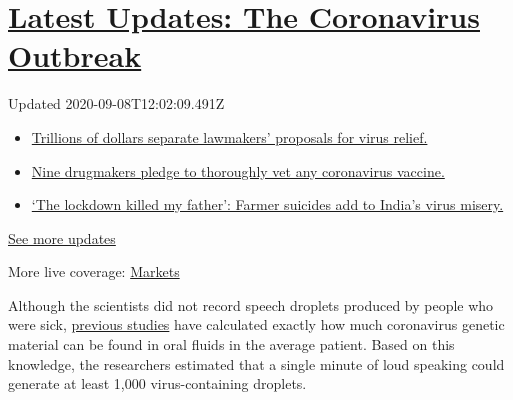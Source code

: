 \hypertarget{latest-updates-the-coronavirus-outbreak}{%
\section{\texorpdfstring{\href{https://www.nytimes3xbfgragh.onion/2020/09/08/world/covid-19-coronavirus.html?action=click\&pgtype=Article\&state=default\&region=MAIN_CONTENT_1\&context=storylines_live_updates}{Latest
Updates: The Coronavirus
Outbreak}}{Latest Updates: The Coronavirus Outbreak}}\label{latest-updates-the-coronavirus-outbreak}}

Updated 2020-09-08T12:02:09.491Z

\begin{itemize}
\tightlist
\item
  \href{https://www.nytimes3xbfgragh.onion/2020/09/08/world/covid-19-coronavirus.html?action=click\&pgtype=Article\&state=default\&region=MAIN_CONTENT_1\&context=storylines_live_updates\#link-46162376}{Trillions
  of dollars separate lawmakers' proposals for virus relief.}
\item
  \href{https://www.nytimes3xbfgragh.onion/2020/09/08/world/covid-19-coronavirus.html?action=click\&pgtype=Article\&state=default\&region=MAIN_CONTENT_1\&context=storylines_live_updates\#link-679303d7}{Nine
  drugmakers pledge to thoroughly vet any coronavirus vaccine.}
\item
  \href{https://www.nytimes3xbfgragh.onion/2020/09/08/world/covid-19-coronavirus.html?action=click\&pgtype=Article\&state=default\&region=MAIN_CONTENT_1\&context=storylines_live_updates\#link-1c973131}{`The
  lockdown killed my father': Farmer suicides add to India's virus
  misery.}
\end{itemize}

\href{https://www.nytimes3xbfgragh.onion/2020/09/08/world/covid-19-coronavirus.html?action=click\&pgtype=Article\&state=default\&region=MAIN_CONTENT_1\&context=storylines_live_updates}{See
more updates}

More live coverage:
\href{https://www.nytimes3xbfgragh.onion/live/2020/09/08/business/stock-market-today-coronavirus?action=click\&pgtype=Article\&state=default\&region=MAIN_CONTENT_1\&context=storylines_live_updates}{Markets}

Although the scientists did not record speech droplets produced by
people who were sick,
\href{https://www.nature.com/articles/s41586-020-2196-x}{previous
studies} have calculated exactly how much coronavirus genetic material
can be found in oral fluids in the average patient. Based on this
knowledge, the researchers estimated that a single minute of loud
speaking could generate at least 1,000 virus-containing droplets.

